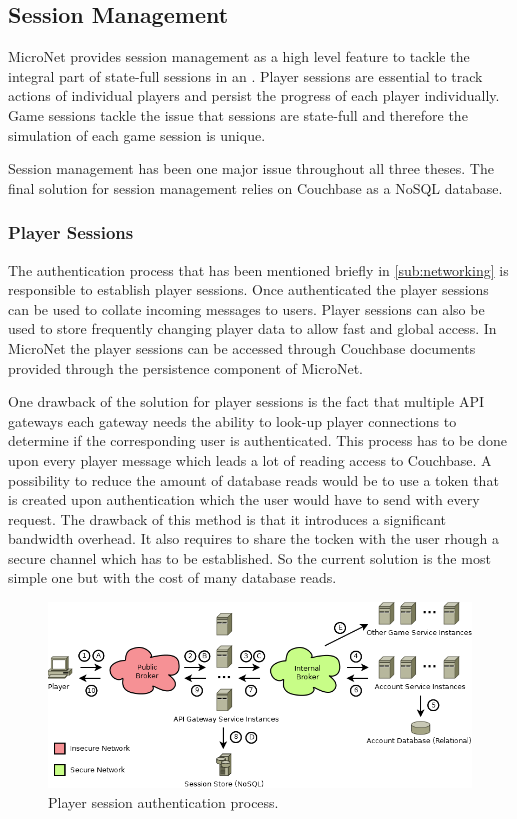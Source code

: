 \subsection{Session Management}
\label{sub:session_management}

MicroNet provides session management as a high level feature to tackle the
integral part of state-full sessions in an \og{}. Player sessions are
essential to track actions of individual players and persist the progress of
each player individually. Game sessions tackle the issue that \og{} sessions are
state-full and therefore the simulation of each game session is unique.

Session management has been one major issue throughout all three theses. The
final solution for session management relies on Couchbase as a NoSQL database.

\subsubsection{Player Sessions}

The authentication process that has been mentioned briefly in
\autoref{sub:networking} is responsible to establish player sessions. Once
authenticated the player sessions can be used to collate incoming messages to
users. Player sessions can also be used to store frequently changing player data
to allow fast and global access. In MicroNet the player sessions can be accessed
through Couchbase documents provided through the persistence component of
MicroNet.

One drawback of the solution for player sessions is the fact that multiple API
gateways each gateway needs the ability to look-up player connections to
determine if the corresponding user is authenticated. This process has to be
done upon every player message which leads a lot of reading access to Couchbase.
A possibility to reduce the amount of database reads would be to use a token
that is created upon authentication which the user would have to send with every
request. The drawback of this method is that it introduces a significant
bandwidth overhead. It also requires to share the tocken with the user rhough a
secure channel which has to be established. So the current solution is the most
simple one but with the cost of many database reads.

\begin{figure}
	\centering
  	\includegraphics[width=\textwidth]{images/architecture/PlayerSessions}
	\caption{Player session authentication process.}
	\label{fig:player_sessions}
\end{figure}

